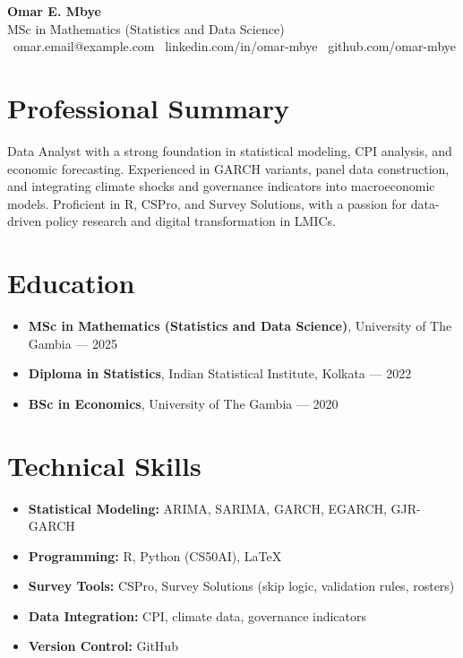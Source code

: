 \documentclass[11pt]{article}
\begin{document}
\begin{center}
    {\LARGE \textbf{Omar E. Mbye}} \\
    MSc in Mathematics (Statistics and Data Science) \\
    \faEnvelope\ omar.email@example.com \quad
    \faLinkedin\ linkedin.com/in/omar-mbye \quad
    \faGithub\ github.com/omar-mbye
\end{center}

\section*{Professional Summary}
Data Analyst with a strong foundation in statistical modeling, CPI analysis, and economic forecasting. Experienced in GARCH variants, panel data construction, and integrating climate shocks and governance indicators into macroeconomic models. Proficient in R, CSPro, and Survey Solutions, with a passion for data-driven policy research and digital transformation in LMICs.

\section*{Education}
\begin{itemize}[leftmargin=*]
    \item \textbf{MSc in Mathematics (Statistics and Data Science)}, University of The Gambia — 2025
    \item \textbf{Diploma in Statistics}, Indian Statistical Institute, Kolkata — 2022
    \item \textbf{BSc in Economics}, University of The Gambia — 2020
\end{itemize}

\section*{Technical Skills}
\begin{itemize}[leftmargin=*]
    \item \textbf{Statistical Modeling:} ARIMA, SARIMA, GARCH, EGARCH, GJR-GARCH
    \item \textbf{Programming:} R, Python (CS50AI), LaTeX
    \item \textbf{Survey Tools:} CSPro, Survey Solutions (skip logic, validation rules, rosters)
    \item \textbf{Data Integration:} CPI, climate data, governance indicators
    \item \textbf{Version Control:} GitHub
\end{itemize}
\end{document}
